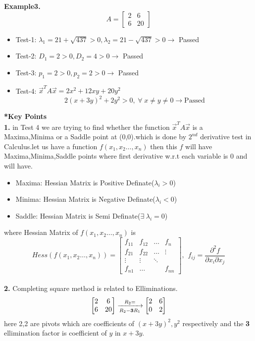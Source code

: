 \documentclass[a4paper,11pt]{article}
\numberwithin{equation}{section}
\begin{document}
\begin{itemize}
\textbf{Example3.}
\[
A=\begin{bmatrix}
    2&6\\6&20
\end{bmatrix}
\]
\begin{itemize}
    \item Test-1: $\lambda_1=21+\sqrt{437}>0,\lambda_2=21-\sqrt{437}>0\rightarrow$  Passed
    \item Test-2: $D_1=2>0,D_2=4>0\rightarrow$ Passed
    \item Test-3: $p_1=2>0,p_2=2>0\rightarrow$ Passed
    \item Test-4: $\vec{x}^TA\vec{x}=2x^2+12xy+20y^2 $
    \[2(x+3y)^2+2y^2>0, \hspace{3pt} \forall \hspace{3pt} x\neq y\neq 0 \rightarrow \text{Passed}\]
\end{itemize}

\textbf{*Key Points}\\

\textbf{1.} in Test 4 we are trying to find whether the function $\vec{x}^TA\vec{x}$ is a Maxima,Minima or a Saddle point at (0,0).which is done by $2^{nd}$ derivative test in Calculus.let us have a function $f(x_1,x_2\dots,x_n) $ then this $f$ will have Maxima,Minima,Saddle points where first derivative w.r.t each variable is 0 and will have.
\begin{itemize}
    \item Maxima: Hessian Matrix is Positive Definate($\lambda_i >0$)
    \item Minima: Hessian Matrix is Negative Definate($\lambda_i <0$)
    \item Saddle: Hessian Matrix is Semi Definate($\exists \hspace{3pt}\lambda_i=0$)
\end{itemize}

where Hessian Matrix of $f(x_1,x_2\dots,x_n)$ is
\[
Hess(f(x_1,x_2\dots,x_n))=\begin{bmatrix}
    f_{11}&f_{12}&\dots&f_n\\
    f_{21}&f_{22}&\dots&\vdots\\
    \vdots&\vdots&\ddots&\\
    f_{n1}&\dots&&f_{nn}
\end{bmatrix},\hspace{5pt} f_{ij}=\frac{\partial^2f}{\partial x_i \partial x_j}
\]
\\
\textbf{2.} Completing square method is related to Elliminations.
\[
\begin{bmatrix}
    2&6\\6&20
\end{bmatrix}\xrightarrow[R_2-\text{\textbf{3}}R_1]{R_2=}
\begin{bmatrix}
    2&6\\0&2
\end{bmatrix}
\]
here 2,2 are pivots which are coefficients of $(x+3y)^2,y^2$ respectively and the \textbf{3} ellimination factor is coefficient of $y$ in $x+3y$.\\


\end{itemize}
\end{document}
